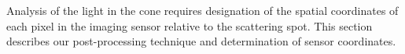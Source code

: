 Analysis of the light in the cone requires designation of the spatial
coordinates of each pixel in the imaging sensor relative to the scattering
spot.  This section describes our post-processing technique and
determination of sensor coordinates.
